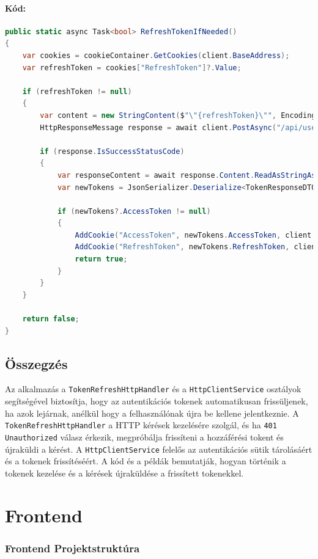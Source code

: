 \documentclass{report}[11pt]
\begin{document}
\subsubsection{Kód:}
\begin{lstlisting}[language=csharp]
public static async Task<bool> RefreshTokenIfNeeded()
{
    var cookies = cookieContainer.GetCookies(client.BaseAddress);
    var refreshToken = cookies["RefreshToken"]?.Value;

    if (refreshToken != null)
    {
        var content = new StringContent($"\"{refreshToken}\"", Encoding.UTF8, "application/json");
        HttpResponseMessage response = await client.PostAsync("/api/users/refresh", content);

        if (response.IsSuccessStatusCode)
        {
            var responseContent = await response.Content.ReadAsStringAsync();
            var newTokens = JsonSerializer.Deserialize<TokenResponseDTO>(responseContent, new JsonSerializerOptions { PropertyNameCaseInsensitive = true });

            if (newTokens?.AccessToken != null)
            {
                AddCookie("AccessToken", newTokens.AccessToken, client.BaseAddress.ToString());
                AddCookie("RefreshToken", newTokens.RefreshToken, client.BaseAddress.ToString());
                return true;
            }
        }
    }

    return false;
}
\end{lstlisting}

\section{Összegzés}
Az alkalmazás a \texttt{TokenRefreshHttpHandler} és a \texttt{HttpClientService} osztályok segítségével biztosítja, hogy az autentikációs tokenek automatikusan frissüljenek, ha azok lejárnak, anélkül hogy a felhasználónak újra be kellene jelentkeznie. A \texttt{TokenRefreshHttpHandler} a HTTP kérések kezelésére szolgál, és ha \texttt{401 Unauthorized} válasz érkezik, megpróbálja frissíteni a hozzáférési tokent és újraküldi a kérést. A \texttt{HttpClientService} felelős az autentikációs sütik tárolásáért és a tokenek frissítéséért. A kód és a példák bemutatják, hogyan történik a tokenek kezelése és a kérések újraküldése a frissített tokenekkel.

\chapter{Frontend}
\subsection{Frontend Projektstruktúra}
\end{document}
